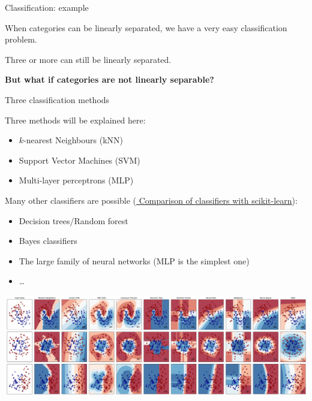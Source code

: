\documentclass[compress,xcolor=table]{beamer}
\begin{document}
\begin{frame}{Classification: example}
\begin{center}
{\begin{tikzpicture}[>=latex,
                starmarker/.style={star, fill=hriSec2Comp,opacity=0.5,inner sep=0,minimum size=4pt}]
            \end{tikzpicture}
        }
    \end{center}


     {
        When categories can be linearly separated, we have a very easy
        classification problem.
    }

     {
        Three or more can still be linearly separated.
    }


     {
        \textbf{But what if categories are not linearly separable?}
    }

\end{frame}

\begin{frame}{Three classification methods}

Three methods will be explained here:

\begin{itemize}

\item $k$-nearest Neighbours (kNN)
\item Support Vector Machines (SVM)
\item Multi-layer perceptrons (MLP)
\end{itemize}

    {\scriptsize
Many other classifiers are possible
    (\href{https://scikit-learn.org/stable/auto_examples/classification/plot_classifier_comparison.html}{\scriptsize
    Comparison of classifiers with scikit-learn}):

\begin{itemize}

\item Decision trees/Random forest
\item Bayes classifiers
\item The large family of neural networks (MLP is the simplest one)
\item \ldots{}
\end{itemize}
    }

    \begin{center}
        \includegraphics[width=0.8\linewidth]{figs/sklearn-classifiers.png}
    \end{center}

\end{frame}
\end{document}
